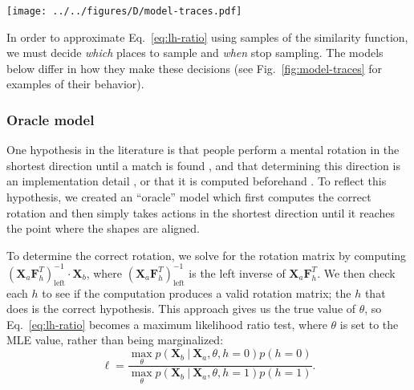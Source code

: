 \documentclass[10pt,letterpaper]{article}
\newcommand{\Xa}[0]{\mathbf{X}_a}
\newcommand{\Xb}[0]{\mathbf{X}_b}
\newcommand{\F}[0]{\mathbf{F}}
\newcommand{\hi}[0]{h=0}
\newcommand{\hf}[0]{h=1}
\begin{document}
\begin{figure*}[t]
  \begin{center}
    \texttt{[image: ../../figures/D/model-traces.pdf]}
    \caption{\textbf{Example stimuli and model behavior.} On the left
      are two stimulus pairs, one ``same'' (top) and one ``flipped''
      (bottom), both with a rotation of $120^\prime$. The grey plots
      show the actions that each model took for these stimuli. The
      color of each point (action) indicates whether the model's
      current mental image was generated under the hypothesis that the
      objects are the same (red) or flipped (blue). The similarity
      functions for each of these hypotheses are shown on the right.}
    \label{fig:model-traces}
  \end{center}
\end{figure*}

In order to approximate Eq.~\ref{eq:lh-ratio} using samples of the
similarity function, we must decide \textit{which} places to sample
and \textit{when} stop sampling. The models below differ in how they
make these decisions (see Fig.~\ref{fig:model-traces} for examples of
their behavior).

\subsubsection{Oracle model}

One hypothesis in the literature is that people perform a mental
rotation in the shortest direction until a match is found
\cite{Shepard1971, Cooper:1975wp}, and that determining this direction
is an implementation detail \cite{Anderson1978}, or that it is
computed beforehand \cite{Funt:1983wn}.  To reflect this hypothesis,
we created an ``oracle'' model which first computes the correct
rotation and then simply takes actions in the shortest direction until
it reaches the point where the shapes are aligned.

To determine the correct rotation, we solve for the rotation matrix by
computing $(\Xa \F_h^T)_\mathrm{left}^{-1}\cdot{}\Xb$, where
$(\Xa\F_h^T)_\mathrm{left}^{-1}$ is the left inverse of
$\Xa\F_h^T$. We then check each $h$ to see if the computation produces
a valid rotation matrix; the $h$ that does is the correct
hypothesis. This approach gives us the true value of $\theta$, so
Eq.~\ref{eq:lh-ratio} becomes a maximum likelihood ratio test, where
$\theta$ is set to the MLE value, rather than being marginalized:
\begin{equation}
  \ell = \frac{\max_\theta p(\Xb\ \vert\ \Xa, \theta, \hi)p(\hi)}{\max_\theta p(\Xb\ \vert\ \Xa, \theta, \hf)p(\hf)}.
  \label{eq:mle-lh-ratio}
\end{equation}
\end{document}
